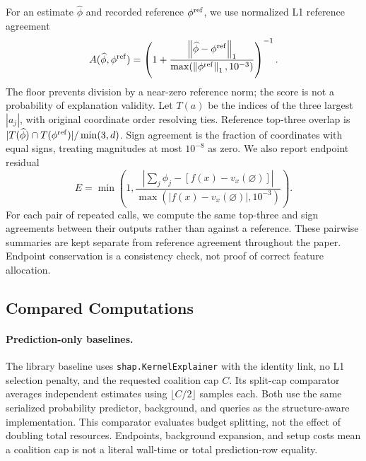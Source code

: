 \documentclass{article}
\newcommand{\norm}[1]{\left\lVert #1\right\rVert_1}
\begin{document}
For an estimate $\widehat\phi$ and recorded reference $\phi^{\rm ref}$, we use normalized L1 reference agreement
\begin{equation}
 A(\widehat\phi,\phi^{\rm ref})=
 \left(1+\frac{\norm{\widehat\phi-\phi^{\rm ref}}}
 {\max(\norm{\phi^{\rm ref}},10^{-3})}\right)^{-1}. \label{eq:agreement}
\end{equation}
The floor prevents division by a near-zero reference norm; the score is not a probability of explanation validity. Let $T(a)$ be the indices of the three largest $|a_j|$, with original coordinate order resolving ties. Reference top-three overlap is $|T(\widehat\phi)\cap T(\phi^{\rm ref})|/\min(3,d)$. Sign agreement is the fraction of coordinates with equal signs, treating magnitudes at most $10^{-8}$ as zero. We also report endpoint residual
\begin{equation}
 E=\min\!\left(1,\frac{|\sum_j\widehat\phi_j-[f(x)-v_x(\varnothing)]|}
 {\max(|f(x)-v_x(\varnothing)|,10^{-3})}\right).
\end{equation}
For each pair of repeated calls, we compute the same top-three and sign agreements between their outputs rather than against a reference. These pairwise summaries are kept separate from reference agreement throughout the paper. Endpoint conservation is a consistency check, not proof of correct feature allocation.

\subsection{Compared Computations}
\paragraph{Prediction-only baselines.}
The library baseline uses \texttt{shap.KernelExplainer} with the identity link, no L1 selection penalty, and the requested coalition cap $C$. Its split-cap comparator averages independent estimates using $\lfloor C/2\rfloor$ samples each. Both use the same serialized probability predictor, background, and queries as the structure-aware implementation. This comparator evaluates budget splitting, not the effect of doubling total resources. Endpoints, background expansion, and setup costs mean a coalition cap is not a literal wall-time or total prediction-row equality.
\end{document}
